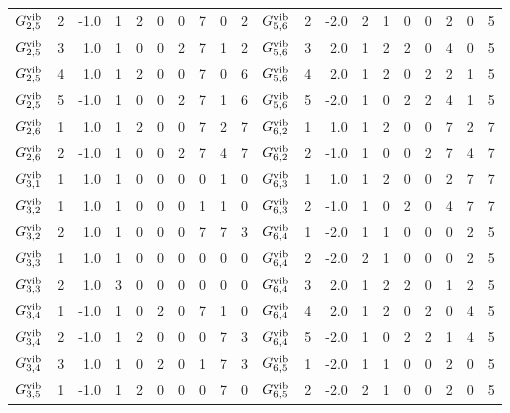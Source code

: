 \begin{tabular}{crrrrrrrrcrrrrrrrr}
    $ G^{\rm vib}_{  2, 5}  $& 2 & -1.0 & 1 & 2 & 0 & 0 & 7 & 0 & 2 &     $    G^{\rm vib}_{ 5, 6}  $&  2  & -2.0 & 2 & 1 & 0 & 0 & 2 & 0 & 5\\
    $ G^{\rm vib}_{  2, 5}  $& 3 &  1.0 & 1 & 0 & 0 & 2 & 7 & 1 & 2 &     $    G^{\rm vib}_{ 5, 6}  $&  3  &  2.0 & 1 & 2 & 2 & 0 & 4 & 0 & 5\\
    $ G^{\rm vib}_{  2, 5}  $& 4 &  1.0 & 1 & 2 & 0 & 0 & 7 & 0 & 6 &     $    G^{\rm vib}_{ 5, 6}  $&  4  &  2.0 & 1 & 2 & 0 & 2 & 2 & 1 & 5\\
    $ G^{\rm vib}_{  2, 5}  $& 5 & -1.0 & 1 & 0 & 0 & 2 & 7 & 1 & 6 &     $    G^{\rm vib}_{ 5, 6}  $&  5  & -2.0 & 1 & 0 & 2 & 2 & 4 & 1 & 5\\
    $ G^{\rm vib}_{  2, 6}  $& 1 &  1.0 & 1 & 2 & 0 & 0 & 7 & 2 & 7 &     $    G^{\rm vib}_{ 6, 2}  $&  1  &  1.0 & 1 & 2 & 0 & 0 & 7 & 2 & 7\\
    $ G^{\rm vib}_{  2, 6}  $& 2 & -1.0 & 1 & 0 & 0 & 2 & 7 & 4 & 7 &     $    G^{\rm vib}_{ 6, 2}  $&  2  & -1.0 & 1 & 0 & 0 & 2 & 7 & 4 & 7\\
    $ G^{\rm vib}_{  3, 1}  $& 1 &  1.0 & 1 & 0 & 0 & 0 & 0 & 1 & 0 &     $    G^{\rm vib}_{ 6, 3}  $&  1  &  1.0 & 1 & 2 & 0 & 0 & 2 & 7 & 7\\
    $ G^{\rm vib}_{  3, 2}  $& 1 &  1.0 & 1 & 0 & 0 & 0 & 1 & 1 & 0 &     $    G^{\rm vib}_{ 6, 3}  $&  2  & -1.0 & 1 & 0 & 2 & 0 & 4 & 7 & 7\\
    $ G^{\rm vib}_{  3, 2}  $& 2 &  1.0 & 1 & 0 & 0 & 0 & 7 & 7 & 3 &     $    G^{\rm vib}_{ 6, 4}  $&  1  & -2.0 & 1 & 1 & 0 & 0 & 0 & 2 & 5\\
    $ G^{\rm vib}_{  3, 3}  $& 1 &  1.0 & 1 & 0 & 0 & 0 & 0 & 0 & 0 &     $    G^{\rm vib}_{ 6, 4}  $&  2  & -2.0 & 2 & 1 & 0 & 0 & 0 & 2 & 5\\
    $ G^{\rm vib}_{  3, 3}  $& 2 &  1.0 & 3 & 0 & 0 & 0 & 0 & 0 & 0 &     $    G^{\rm vib}_{ 6, 4}  $&  3  &  2.0 & 1 & 2 & 2 & 0 & 1 & 2 & 5\\
    $ G^{\rm vib}_{  3, 4}  $& 1 & -1.0 & 1 & 0 & 2 & 0 & 7 & 1 & 0 &     $    G^{\rm vib}_{ 6, 4}  $&  4  &  2.0 & 1 & 2 & 0 & 2 & 0 & 4 & 5\\
    $ G^{\rm vib}_{  3, 4}  $& 2 & -1.0 & 1 & 2 & 0 & 0 & 0 & 7 & 3 &     $    G^{\rm vib}_{ 6, 4}  $&  5  & -2.0 & 1 & 0 & 2 & 2 & 1 & 4 & 5\\
    $ G^{\rm vib}_{  3, 4}  $& 3 &  1.0 & 1 & 0 & 2 & 0 & 1 & 7 & 3 &     $    G^{\rm vib}_{ 6, 5}  $&  1  & -2.0 & 1 & 1 & 0 & 0 & 2 & 0 & 5\\
    $ G^{\rm vib}_{  3, 5}  $& 1 & -1.0 & 1 & 2 & 0 & 0 & 0 & 7 & 0 &     $    G^{\rm vib}_{ 6, 5}  $&  2  & -2.0 & 2 & 1 & 0 & 0 & 2 & 0 & 5\\

\end{tabular}

